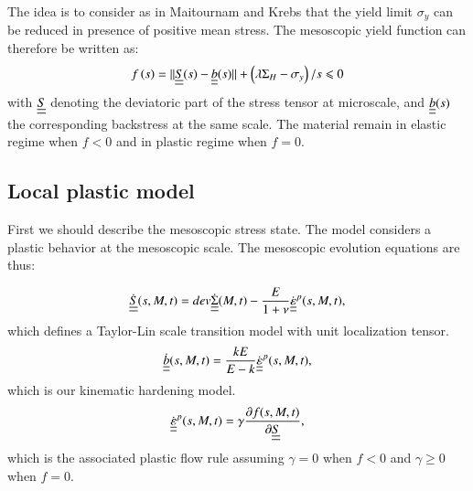 \documentclass[3p,times,number,review]{elsarticle}
\begin{document}
The idea is to consider as in Maitournam and Krebs\cite{Maitournam2011232} that the yield limit $\sigma_y$ can be reduced in presence of positive mean stress. The mesoscopic yield function can therefore be written as:
\begin{equation}
f\left(s\right)=||\uline{\uline{S}}(s)-\uline{\uline{b}}(s)||+\left( \lambda \Sigma_H-\sigma_y\right) /s\leqslant 0
\label{yieldfun}
\end{equation}
with $\uline{\uline{S}}$ denoting the deviatoric part of the stress tensor at microscale, and $\uline{\uline{b}}(s)$ the corresponding backstress at the same scale. The material remain in elastic regime when $f<0$ and in plastic regime when $f=0$.

\subsection{Local plastic model}
First we should describe the mesoscopic stress state.  The model considers a plastic 
behavior at the mesoscopic scale. The mesoscopic evolution equations are thus:

 
	\begin{equation}
    \dot{\uline{\uline{S}}}(s,M,t)=dev\dot{\uline{\uline{\Sigma}}}(M,t)-\dfrac{E}{1+\nu}\dot{\uline{\uline{\varepsilon}}}^p(s,M,t), 
	\end{equation}
     which defines a Taylor-Lin scale transition model with unit localization tensor\cite{Bosia201239}.
		\begin{equation}
		\dot{\uline{\uline{b}}}(s,M,t)=\dfrac{kE}{E-k} \dot{\uline{\uline{\varepsilon}}}^p(s,M,t), 
		\end{equation}
		which is our kinematic hardening model.
		\begin{equation}
		\dot{\uline{\uline{\varepsilon}}}^p(s,M,t)=\gamma\dfrac{\partial f(s,M,t)}{\partial \uline{\uline{S}}}, 
		\end{equation}
		which is the associated plastic flow rule assuming $\gamma=0$ when $f<0$ and  $\gamma\geqslant0$ when $f=0$.
\end{document}
